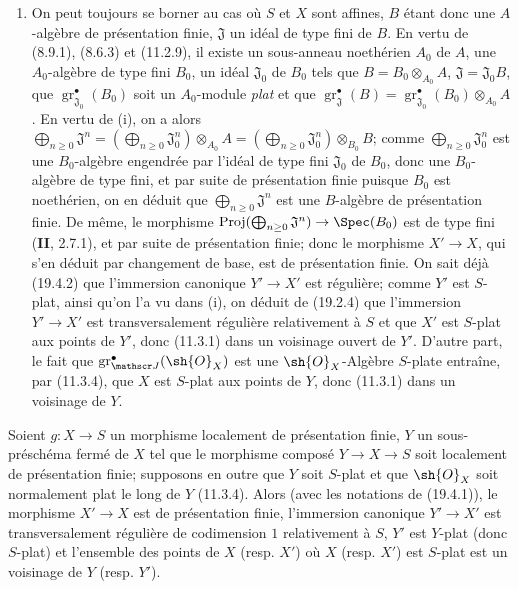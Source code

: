 \begin{enumerate}
  \item[(ii)] On peut toujours se borner au cas où $S$ et $X$ sont affines, $B$ étant donc une $A$-algèbre de présentation finie, $\mathfrak J$ un idéal de type fini de $B$. En vertu de (8.9.1), (8.6.3) et (11.2.9), il existe un sous-anneau noethérien $A_0$ de $A$, une $A_0$-algèbre de type fini $B_0$, un idéal $\mathfrak J_0$ de $B_0$ tels que $B=B_0\otimes_{A_0}A$, $\mathfrak J=\mathfrak J_0B$, que $\operatorname{gr}_{\mathfrak J_0}^\bullet(B_0)$ soit un $A_0$-module \emph{plat} et que $\operatorname{gr}_{\mathfrak J}^\bullet(B)=\operatorname{gr}_{\mathfrak J_0}^\bullet(B_0)\otimes_{A_0}A$. En vertu de (i), on a alors $\bigoplus_{n\geq0}\mathfrak J^n=(\bigoplus_{n\geq0}\mathfrak J_0^n)\otimes_{A_0}A=(\bigoplus_{n\geq0}\mathfrak J_0^n)\otimes_{B_0}B$; comme $\bigoplus_{n\geq0}\mathfrak J_0^n$ est une $B_0$-algèbre engendrée par l'idéal de type fini $\mathfrak J_0$ de $B_0$, donc une $B_0$-algèbre de type fini, et par suite de présentation finie puisque $B_0$ est noethérien, on en déduit que $\bigoplus_{n\geq0}\mathfrak J^n$ est une $B$-algèbre de présentation finie. De même, le morphisme $\operatorname{Proj}(\bigoplus_{n\geq0}\mathfrak J^n)\to\Spec(B_0)$ est de type fini (\textbf{II}, 2.7.1), et par suite de présentation finie; donc le morphisme $X'\to X$, qui s'en déduit par changement de base, est de présentation finie. On sait déjà (19.4.2) que l'immersion canonique $Y'\to X'$ est régulière; comme $Y'$ est $S$-plat, ainsi qu'on l'a vu dans (i), on déduit de (19.2.4) que l'immersion $Y'\to X'$ est transversalement régulière relativement à $S$ et que $X'$ est $S$-plat aux points de $Y'$, donc (11.3.1) dans un voisinage ouvert de $Y'$. D'autre part, le fait que $\operatorname{gr}_{\mathscr J}^\bullet(\sh{O}_X)$ est une $\sh{O}_X$-Algèbre $S$-plate entraîne, par (11.3.4), que $X$ est $S$-plat aux points de $Y$, donc (11.3.1) dans un voisinage de $Y$.
\end{enumerate}

\begin{corollary}[19.4.7]
\label{IV.19.4.7}
Soient $g:X\to S$ un morphisme localement de présentation finie, $Y$ un sous-préschéma fermé de $X$ tel que le morphisme composé $Y\to X\to S$ soit localement de présentation finie; supposons en outre que $Y$ soit $S$-plat et que $\sh{O}_X$ soit normalement plat le long de $Y$ \textup{(11.3.4)}. Alors \textup{(avec les notations de (19.4.1))}, le morphisme $X'\to X$ est de présentation finie, l'immersion canonique $Y'\to X'$ est transversalement régulière de codimension $1$ relativement à $S$, $Y'$ est $Y$-plat (donc $S$-plat) et l'ensemble des points de $X$ \textup{(resp. $X'$)} où $X$ \textup{(resp. $X'$)} est $S$-plat est un voisinage de $Y$ \textup{(resp. $Y'$)}.
\end{corollary}

